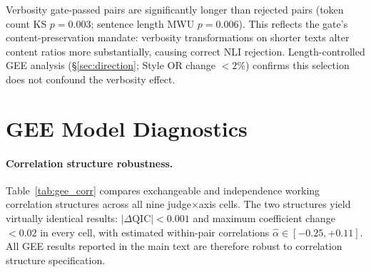 Verbosity gate-passed pairs are significantly longer than rejected pairs (token count KS $p = 0.003$; sentence length MWU $p = 0.006$).
This reflects the gate's content-preservation mandate: verbosity transformations on shorter texts alter content ratios more substantially, causing correct NLI rejection.
Length-controlled GEE analysis (\S\ref{sec:direction}; Style OR change ${<}2\%$) confirms this selection does not confound the verbosity effect.

\section{GEE Model Diagnostics}
\label{app:gee_diagnostics}

\paragraph{Correlation structure robustness.}
Table~\ref{tab:gee_corr} compares exchangeable and independence working correlation structures across all nine judge$\times$axis cells.
The two structures yield virtually identical results: $|\Delta\text{QIC}| < 0.001$ and maximum coefficient change ${<}0.02$ in every cell, with estimated within-pair correlations $\hat{\alpha} \in [-0.25, +0.11]$.
All GEE results reported in the main text are therefore robust to correlation structure specification.

\begin{table}[h]
\centering
\small
\caption{GEE correlation structure comparison across nine judge$\times$axis cells.}
\label{tab:gee_corr}
\end{table}

